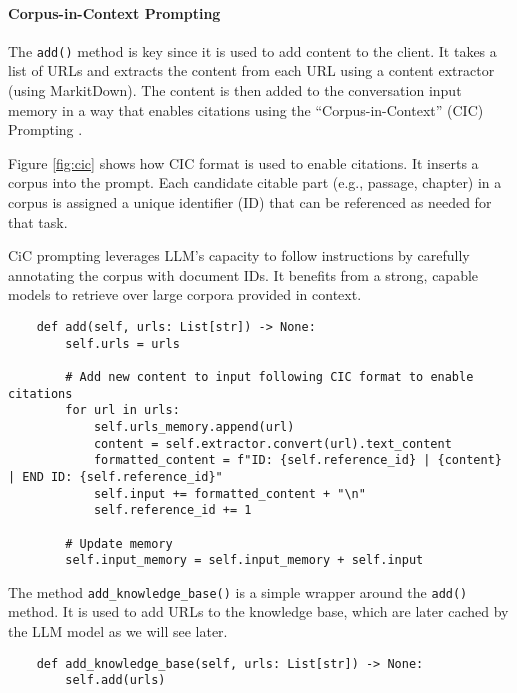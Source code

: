 \paragraph{Corpus-in-Context Prompting}

The \texttt{add()} method is key since it is used to add content to the client. It takes a list of URLs and extracts the content from each URL using a content extractor (using MarkitDown). The content is then added to the conversation input memory in a way that enables citations using the ``Corpus-in-Context'' (CIC) Prompting .

Figure \ref{fig:cic} shows how CIC format is used to enable citations. It inserts a corpus into the prompt. Each candidate citable part (e.g., passage, chapter) in a corpus is assigned a unique identifier (ID) that can be referenced as needed for that task.


CiC prompting leverages LLM's capacity to follow instructions by carefully annotating the corpus with document IDs. It benefits from a strong, capable models to retrieve over large corpora provided in context.

\begin{verbatim}
    def add(self, urls: List[str]) -> None:
        self.urls = urls

        # Add new content to input following CIC format to enable citations
        for url in urls:
            self.urls_memory.append(url)
            content = self.extractor.convert(url).text_content
            formatted_content = f"ID: {self.reference_id} | {content} | END ID: {self.reference_id}"
            self.input += formatted_content + "\n" 
            self.reference_id += 1
        
        # Update memory
        self.input_memory = self.input_memory + self.input
\end{verbatim}

The method \texttt{add\_knowledge\_base()} is a simple wrapper around the \texttt{add()} method. It is used to add URLs to the knowledge base, which are later cached by the LLM model as we will see later.

\begin{verbatim}
    def add_knowledge_base(self, urls: List[str]) -> None:
        self.add(urls)
\end{verbatim}

